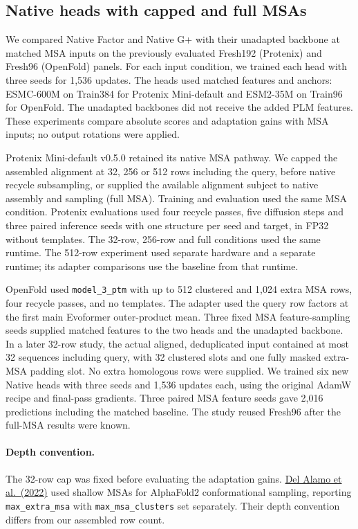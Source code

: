 \subsection{Native heads with capped and full MSAs}
\label{app:followup_msa}

We compared Native Factor and Native G+ with their unadapted backbone
at matched MSA inputs on the previously evaluated Fresh192 (Protenix)
and Fresh96 (OpenFold) panels. For each input condition, we trained
each head with three seeds for 1,536 updates. The heads used matched
features and anchors: ESMC-600M on Train384 for Protenix Mini-default
and ESM2-35M on Train96 for OpenFold. The unadapted backbones did not
receive the added PLM features. These experiments compare absolute
scores and adaptation gains with MSA inputs; no output rotations were
applied.

Protenix Mini-default v0.5.0 retained its native MSA pathway. We
capped the assembled alignment at 32, 256 or 512 rows including the
query, before native recycle subsampling, or supplied the available
alignment subject to native assembly and sampling (full MSA).
Training and evaluation used the same MSA condition. Protenix evaluations used
four recycle passes, five diffusion steps and three paired inference
seeds with one structure per seed and target, in FP32 without templates.
The 32-row, 256-row and full conditions used the same runtime.
The 512-row experiment used separate hardware and a separate runtime;
its adapter comparisons use the baseline from that runtime.

OpenFold used \texttt{model\_3\_ptm} with up to 512 clustered and
1,024 extra MSA rows, four recycle passes, and no templates. The
adapter used the query row factors at the first main Evoformer
outer-product mean. Three fixed MSA feature-sampling seeds supplied
matched features to the two heads and the unadapted backbone.
In a later 32-row study, the actual aligned, deduplicated input contained
at most 32 sequences including query, with 32 clustered slots and one
fully masked extra-MSA padding slot. No extra homologous rows were supplied.
We trained six new Native heads with three seeds and 1,536 updates each,
using the original AdamW recipe and final-pass gradients. Three paired
MSA feature seeds gave 2,016 predictions including the matched baseline.
The study reused Fresh96 after the full-MSA results were known.

\paragraph{Depth convention.}
The 32-row cap was fixed before evaluating the adaptation gains.
\href{https://elifesciences.org/articles/75751\#s4}{Del Alamo et al.\ (2022)}
used shallow MSAs for AlphaFold2 conformational sampling, reporting
\texttt{max\_extra\_msa} with \texttt{max\_msa\_clusters} set separately.
Their depth convention differs from our assembled row count.

